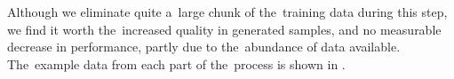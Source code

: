 Although we eliminate quite a~large chunk of the~training data during this step, we find it worth the~increased quality in generated samples, and no measurable decrease in performance, partly due to the~abundance of data available. The~example data from each part of the~process is shown in .



